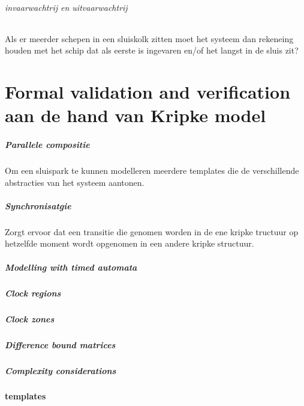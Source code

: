 {{{{{{{{{\subparagraph{invaarwachtrij en uitvaarwachtrij}
Als er meerder schepen in een sluiskolk zitten moet het systeem dan rekeneing houden met het schip dat als eerste is ingevaren en/of het langst in de sluis zit?





\chapter{Formal validation and verification aan de hand van Kripke model}

\paragraph{Parallele compositie}
Om een sluispark te kunnen modelleren meerdere templates die de verschillende abstracties van het systeem aantonen.

\paragraph{Synchronisatgie}
Zorgt ervoor dat  een transitie die genomen worden in de ene kripke tructuur op hetzelfde moment wordt opgenomen in een andere kripke structuur.

\paragraph{Modelling with timed automata}
\paragraph{Clock regions}
\paragraph{Clock zones}
\paragraph{Difference bound matrices}
\paragraph{Complexity considerations}



\subsubsection{templates}

}}}}}}}}}

